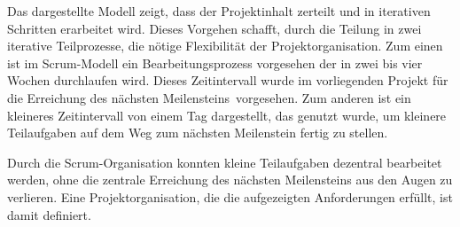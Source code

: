 Das dargestellte Modell zeigt, dass der Projektinhalt zerteilt und in iterativen Schritten erarbeitet wird. Dieses
Vorgehen schafft, durch die Teilung in zwei iterative Teilprozesse, die nötige Flexibilität der Projektorganisation.
Zum einen ist im Scrum-Modell ein Bearbeitungsprozess vorgesehen
der in zwei bis vier Wochen durchlaufen wird. Dieses Zeitintervall wurde im vorliegenden Projekt für die Erreichung des
nächsten Meilensteins\footnotemark\ vorgesehen. Zum anderen ist ein kleineres Zeitintervall von einem Tag dargestellt, das
genutzt wurde, um kleinere Teilaufgaben auf dem Weg zum nächsten Meilenstein fertig zu stellen.


Durch die Scrum-Organisation konnten kleine Teilaufgaben dezentral bearbeitet werden, ohne die zentrale Erreichung des
nächsten Meilensteins aus den Augen zu verlieren. Eine Projektorganisation, die die aufgezeigten Anforderungen
erfüllt, ist damit definiert.





